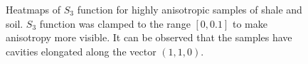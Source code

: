\documentclass[1p]{elsarticle}
\begin{document}
\begin{figure}[tp]
  \centering
  \hfill
  \hfill
  \caption[]{Heatmaps of $S_3$ function for highly anisotropic samples of shale
    and soil. $S_3$ function was clamped to the range $[0, 0.1]$ to make
    anisotropy more visible. It can be observed that the samples have
    cavities elongated along the vector $(1, 1, 0)$.}
  \label{fig:heatmaps}
\end{figure}
\end{document}
